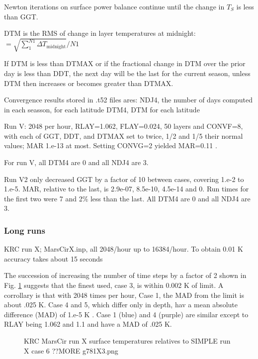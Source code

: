 \documentclass{article}
\begin{document}
Newton iterations on surface power balance continue until the change in $T_S$ is less than GGT.

DTM is the RMS of change in layer temperatures at midnight: $=\sqrt{ \sum_1^{N1} \Delta T_\mathrm{midnight} } / N1 $

If DTM is less than DTMAX or if the fractional change in DTM over the prior day is less than DDT, the next day will be the last for the current season, unless DTM then increases or becomes greater than DTMAX. 

Convergence results stored in .t52 files ares:
 \qi NDJ4, the number of days computed in each seasson, for each latitude
\qi DTM4, DTM for each latitude

Run V:  2048  per hour, RLAY=1.062, FLAY=0.024, 50 layers and CONVF=8, with each of GGT, DDT, and DTMAX set to twice, 1/2 and 1/5 their normal values; MAR 1.e-13 at most. Setting CONVG=2 yielded MAR=0.11 .

For run V,  all DTM4 are 0 and all NDJ4 are 3.

Run V2 only decreased GGT by a factor of 10 between cases, covering 1.e-2 to 1.e-5. MAR, relative to the last, is  2.9e-07,   8.5e-10,   4.5e-14 and 0. Run times for the first two were 7 and 2\% less than the last.  All DTM4 are 0 and all NDJ4 are 3.


\subsubsection{Long runs} %

KRC run X; MarsCirX.inp, all 2048/hour up to 16384/hour.
\qi To obtain 0.01 K accuracy takes about 15 seconds  

The succession of increasing the number of time steps by a factor of 2 shown in
Fig. \ref{g781X3} suggests that the finest used, case 3, is within 0.002 K of
limit.  A corrollary is that with 2048 times per hour, Case 1, the MAD from the
limit is about .025 K.  Case 4 and 5, which differ only in depth, hav a mean
absolute difference (MAD) of 1.e-5 K . Case 1 (blue) and 4 (purple) are similar
except to RLAY being 1.062 and 1.1 and have a MAD of .025 K.

\begin{figure}[!ht] 
\caption[KRC relative to SIMPLE:6]{ KRC MarsCir run X surface temperatures relatives to SIMPLE run X case 6 ??MORE 
\label{g781X3} g781X3.png  }
\end{figure} 
\end{document}
